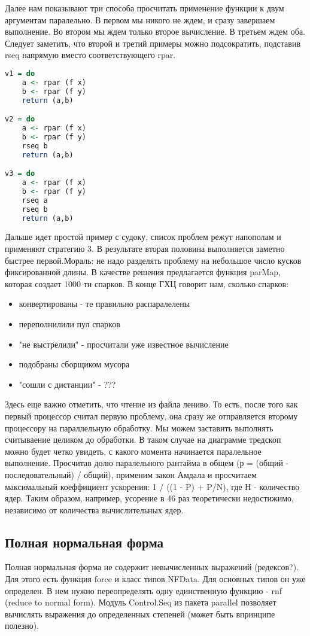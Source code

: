 \documentclass[12pt,a4paper]{article}
\begin{document}
Далее нам показывают три способа просчитать применение функции к двум аргументам паралельно. В первом мы никого не ждем, и сразу завершаем выполнение. Во втором мы ждем только второе вычисление. В третьем ждем оба. Следует заметить, что второй и третий примеры можно подсократить, подставив rseq напрямую вместо соответствующего rpar. 


\begin{lstlisting}[language=Haskell]
v1 = do
	a <- rpar (f x)
	b <- rpar (f y)
	return (a,b)

v2 = do
	a <- rpar (f x)
	b <- rpar (f y)
	rseq b
	return (a,b)

v3 = do
	a <- rpar (f x)
	b <- rpar (f y)
	rseq a
	rseq b
	return (a,b)

\end{lstlisting}

Дальше идет простой пример с судоку, список проблем режут напополам и применяют стратегию 3. В результате вторая половина выполняется заметно быстрее первой.Мораль: не надо разделять проблему на небольшое число кусков фиксированной длины. В качестве решения предлагается функция parMap, которая создает 1000 тн спарков. В конце  ГХЦ говорит нам, сколько спарков:
\begin{itemize}
\item конвертированы - те правильно распаралелены
\item переполнилили пул спарков
\item "не выстрелили" - просчитали уже известное вычисление
\item подобраны сборщиком мусора
\item "сошли с дистанции" - ???
\end{itemize}

Здесь еще важно отметить, что чтение из файла лениво. То есть, после того как первый процессор считал первую проблему, она сразу же отправляется второму процессору на параллельную обработку. Мы можем заставить выполнять считываение целиком до обработки. В таком случае на диаграмме тредскоп можно будет четко увидеть, с какого момента начинается паралельное выполнение. Просчитав долю паралельного рантайма в общем (р = (общий - последовательный) / общий), применим закон Амдала и просчитаем максимальный коеффициент ускорения: 1 / ((1 - P) + P/N), где Н -  количество ядер. Таким образом, например, усорение в 46 раз теоретически недостижимо, независимо от количества вычислительных ядер.\\

\subsection{Полная нормальная форма}

Полная нормальная форма не содержит невычисленных выражений (редексов?). Для этого есть функция force и класс типов NFData. Для основных типов он уже определен. В нем нужно переопределять одну единственную функцию - rnf (reduce to normal form). Модуль Control.Seq из пакета parallel позволяет вычислять выражения до определенных степеней (может быть впринципе полезно).
\end{document}

